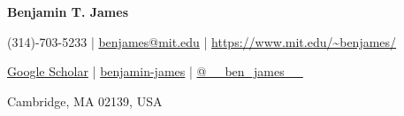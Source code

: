 \documentclass[letter,11pt]{article}
\let\HREF\href
\renewcommand{\href}[2]{\HREF{#1}{\begingroup\UrlFont #2\endgroup}}
\newcommand{\socialicon}[1]{\raisebox{-0.05em}{\resizebox{!}{1em}{#1}}}
\begin{document}
\begin{center}
	{\Huge\textbf{Benjamin T. James}}
\end{center}
\vspace{-6mm}

\begin{center}
	\small{
		\socialicon{\faPhone} (314)-703-5233 | \socialicon{\faEnvelope} \href{mailto:benjames@mit.edu}{benjames@mit.edu} |
		\socialicon{\faUser} \url{https://www.mit.edu/~benjames/}
	}
\end{center}
\vspace{-6mm}

\begin{center}
	\small{
		\socialicon{\faBookReader} \href{https://scholar.google.com/citations?user=t0y3zRkAAAAJ}{Google Scholar} |
		\socialicon{\faGithub} \href{https://github.com/benjamin-james}{benjamin-james} |
		\socialicon{\faTwitter} \href{https://twitter.com/\_\_ben\_james\_\_}{@\_\_ben\_james\_\_}
	}
\end{center}
\vspace{-6mm}
\begin{center}
	\small{Cambridge, MA 02139, USA}
\end{center}

\vspace{-4mm}

\end{document}
